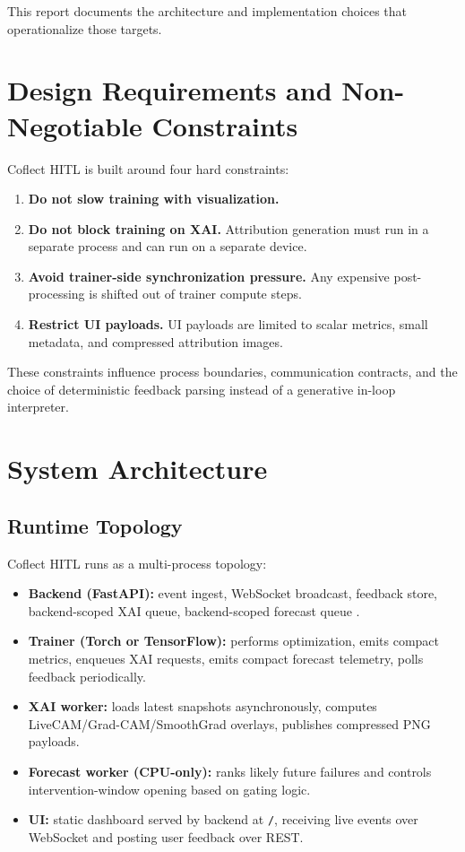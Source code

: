 \documentclass[11pt]{article}
\begin{document}
This report documents the architecture and implementation choices that operationalize those targets.

\section{Design Requirements and Non-Negotiable Constraints}
Coflect HITL is built around four hard constraints:
\begin{enumerate}[leftmargin=1.5em]
  \item \textbf{Do not slow training with visualization.}
  \item \textbf{Do not block training on XAI.} Attribution generation must run in a separate process and can run on a separate device.
  \item \textbf{Avoid trainer-side synchronization pressure.} Any expensive post-processing is shifted out of trainer compute steps.
  \item \textbf{Restrict UI payloads.} UI payloads are limited to scalar metrics, small metadata, and compressed attribution images.
\end{enumerate}

These constraints influence process boundaries, communication contracts, and the choice of deterministic feedback parsing instead of a generative in-loop interpreter.

\section{System Architecture}
\subsection{Runtime Topology}
Coflect HITL runs as a multi-process topology:
\begin{itemize}[leftmargin=1.5em]
  \item \textbf{Backend (FastAPI):} event ingest, WebSocket broadcast, feedback store, backend-scoped XAI queue, backend-scoped forecast queue \cite{fastapi}.
  \item \textbf{Trainer (Torch or TensorFlow):} performs optimization, emits compact metrics, enqueues XAI requests, emits compact forecast telemetry, polls feedback periodically.
  \item \textbf{XAI worker:} loads latest snapshots asynchronously, computes LiveCAM/Grad-CAM/SmoothGrad overlays, publishes compressed PNG payloads.
  \item \textbf{Forecast worker (CPU-only):} ranks likely future failures and controls intervention-window opening based on gating logic.
  \item \textbf{UI:} static dashboard served by backend at \texttt{/}, receiving live events over WebSocket and posting user feedback over REST.
\end{itemize}
\end{document}
